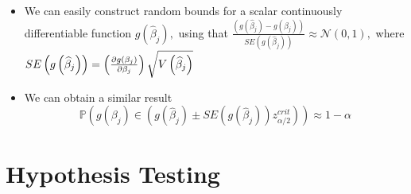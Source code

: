 \documentclass[notes=show]{beamer}
\begin{document}
\begin{frame}%


\begin{itemize}
\item We can easily construct random bounds for a scalar continuously
differentiable function $g\left( \widehat{\beta }_{j}\right) ,$ using that $%
\frac{\left( g\left( \widehat{\beta }_{j}\right) -g\left( \beta _{j}\right)
\right) }{SE\left( g\left( \widehat{\beta }_{j}\right) \right) }\approx 
\mathcal{N}\left( 0,1\right) ,$ where $SE\left( g\left( \widehat{\beta }%
_{j}\right) \right) =\left( \frac{\partial g\left( \beta _{j}\right) }{%
\partial \beta _{j}}\right) \sqrt{V\left( \widehat{\beta }_{j}\right) }$

\item We can obtain a similar result%
\begin{equation*}
\mathbb{P}\left( g\left( \beta _{j}\right) \in \left( g\left( \widehat{\beta 
}_{j}\right) \pm SE(g\left( \widehat{\beta }_{j}\right) )z_{\alpha
/2}^{crit}\right) \right) \approx 1-\alpha
\end{equation*}
\end{itemize}

\end{frame}%

\section{Hypothesis Testing}
\end{document}
